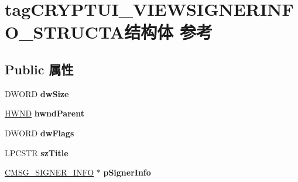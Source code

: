 \hypertarget{structtag_c_r_y_p_t_u_i___v_i_e_w_s_i_g_n_e_r_i_n_f_o___s_t_r_u_c_t_a}{}\section{tag\+C\+R\+Y\+P\+T\+U\+I\+\_\+\+V\+I\+E\+W\+S\+I\+G\+N\+E\+R\+I\+N\+F\+O\+\_\+\+S\+T\+R\+U\+C\+T\+A结构体 参考}
\label{structtag_c_r_y_p_t_u_i___v_i_e_w_s_i_g_n_e_r_i_n_f_o___s_t_r_u_c_t_a}
\subsection*{Public 属性}
\begin{DoxyCompactItemize}
\item 
\mbox{\label{structtag_c_r_y_p_t_u_i___v_i_e_w_s_i_g_n_e_r_i_n_f_o___s_t_r_u_c_t_a_acc08242a7378a156a94e5e63c5787b0a}} 
D\+W\+O\+RD {\bfseries dw\+Size}
\item 
\mbox{\label{structtag_c_r_y_p_t_u_i___v_i_e_w_s_i_g_n_e_r_i_n_f_o___s_t_r_u_c_t_a_abce9a862c7a306602c9a315174f1059b}} 
\hyperlink{interfacevoid}{H\+W\+ND} {\bfseries hwnd\+Parent}
\item 
\mbox{\label{structtag_c_r_y_p_t_u_i___v_i_e_w_s_i_g_n_e_r_i_n_f_o___s_t_r_u_c_t_a_a6240c07b93e50886a385fa0e50dd623a}} 
D\+W\+O\+RD {\bfseries dw\+Flags}
\item 
\mbox{\label{structtag_c_r_y_p_t_u_i___v_i_e_w_s_i_g_n_e_r_i_n_f_o___s_t_r_u_c_t_a_a6e87fa5611084f8a20fa072de24fc2a6}} 
L\+P\+C\+S\+TR {\bfseries sz\+Title}
\item 
\mbox{\label{structtag_c_r_y_p_t_u_i___v_i_e_w_s_i_g_n_e_r_i_n_f_o___s_t_r_u_c_t_a_a0ee6c63d640c206c36164359093d75e6}} 
\hyperlink{struct___c_m_s_g___s_i_g_n_e_r___i_n_f_o}{C\+M\+S\+G\+\_\+\+S\+I\+G\+N\+E\+R\+\_\+\+I\+N\+FO} $\ast$ {\bfseries p\+Signer\+Info}

\end{DoxyCompactItemize}

